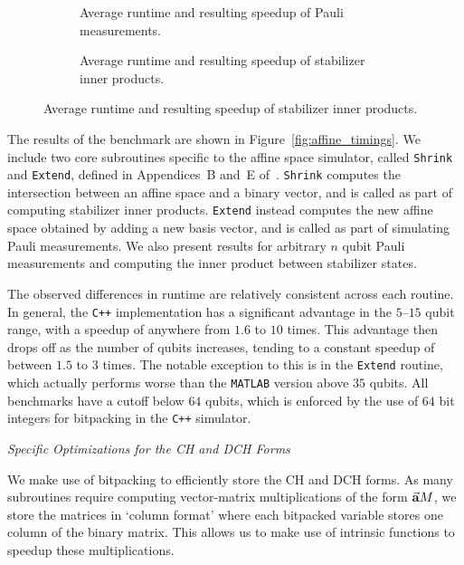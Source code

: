 \begin{figure}[p]\ContinuedFloat
\begin{subfigure}[t]{0.9\textwidth}
    \begin{scaletikzpicturetowidth}{\textwidth}
        
    \end{scaletikzpicturetowidth}
    \caption{Average runtime and resulting speedup of Pauli measurements.}
\end{subfigure}
\begin{subfigure}[t]{0.9\textwidth}
    \caption{Average runtime and resulting speedup of stabilizer inner products.}
    \begin{scaletikzpicturetowidth}{\textwidth}
        
    \end{scaletikzpicturetowidth}
\end{subfigure}
\end{figure}
The results of the benchmark are shown in Figure~\ref{fig:affine_timings}. We include two core subroutines specific to the affine space simulator, called \texttt{Shrink} and \texttt{Extend}, defined in Appendices~B and~E of~\cite{Bravyi2016}. \texttt{Shrink} computes the intersection between an affine space and a binary vector, and is called as part of computing stabilizer inner products. \texttt{Extend} instead computes the new affine space obtained by adding a new basis vector, and is called as part of simulating Pauli measurements. We also present results for arbitrary $n$ qubit Pauli measurements and computing the inner product between stabilizer states.\par
The observed differences in runtime are relatively consistent across each routine. In general, the \texttt{C++} implementation has a significant advantage in the $5$--$15$ qubit range, with a speedup of anywhere from $1.6$ to $10$ times. This advantage then drops off as the number of qubits increases, tending to a constant speedup of between $1.5$ to $3$ times. The notable exception to this is in the \texttt{Extend} routine, which actually performs worse than the \texttt{MATLAB} version above $35$ qubits. All benchmarks have a cutoff below $64$ qubits, which is enforced by the use of $64$ bit integers for bitpacking in the \texttt{C++} simulator.
\par
\large{\itshape{Specific Optimizations for the CH and DCH Forms}}\par
We make use of bitpacking to efficiently store the CH and DCH forms. As many subroutines require computing vector-matrix multiplications of the form $\va{a}M$, we store the matrices in `column format' where each bitpacked variable stores one column of the binary matrix. This allows us to make use of intrinsic functions to speedup these multiplications.\par
